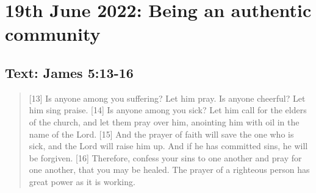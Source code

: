 \section{19th June 2022: Being an authentic community}
\subsection*{Text: James 5:13-16}
  \begin{quote}
    [13] Is anyone among you suffering?  Let him pray.  Is anyone cheerful?
    Let him sing praise.  [14] Is anyone among you sick?  Let him call for
    the elders of the church, and let them pray over him, anointing him with
    oil in the name of the Lord.  [15] And the prayer of faith will save the
    one who is sick, and the Lord will raise him up.  And if he has committed
    sins, he will be forgiven.  [16] Therefore, confess your sins to one
    another and pray for one another, that you may be healed.  The prayer of
    a righteous person has great power as it is working.
  \end{quote}

